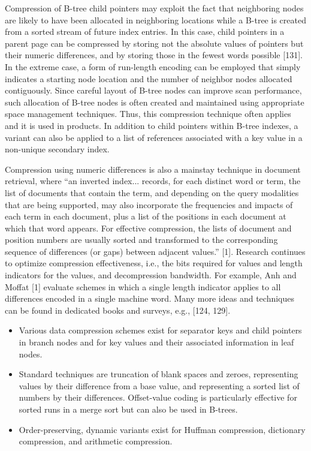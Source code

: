 Compression of B-tree child pointers may exploit the fact that
neighboring nodes are likely to have been allocated in neighboring
locations while a B-tree is created from a sorted stream of future index
entries. In this case, child pointers in a parent page can be compressed
by storing not the absolute values of pointers but their numeric
differences, and by storing those in the fewest words possible
{[}131{]}. In the extreme case, a form of run-length encoding can be
employed that simply indicates a starting node location and the number
of neighbor nodes allocated contiguously. Since careful layout of B-tree
nodes can improve scan performance, such allocation of B-tree nodes is
often created and maintained using appropriate space management
techniques. Thus, this compression technique often applies and it is
used in products. In addition to child pointers within B-tree indexes, a
variant can also be applied to a list of references associated with a
key value in a non-unique secondary index.

Compression using numeric differences is also a mainstay technique in
document retrieval, where ``an inverted index... records, for each
distinct word or term, the list of documents that contain the term, and
depending on the query modalities that are being supported, may also
incorporate the frequencies and impacts of each term in each document,
plus a list of the positions in each document at which that word
appears. For effective compression, the lists of document and position
numbers are usually sorted and transformed to the corresponding sequence
of differences (or gaps) between adjacent values.'' {[}1{]}. Research
continues to optimize compression effectiveness, i.e., the bits required
for values and length indicators for the values, and decompression
bandwidth. For example, Anh and Moffat {[}1{]} evaluate schemes in which
a single length indicator applies to all differences encoded in a single
machine word. Many more ideas and techniques can be found in dedicated
books and surveys, e.g., {[}124, 129{]}.

\begin{itemize}
\item
  Various data compression schemes exist for separator keys and child
  pointers in branch nodes and for key values and their associated
  information in leaf nodes.
\item
  Standard techniques are truncation of blank spaces and zeroes,
  representing values by their difference from a base value, and
  representing a sorted list of numbers by their differences.
  Offset-value coding is particularly effective for sorted runs in a
  merge sort but can also be used in B-trees.
\item
  Order-preserving, dynamic variants exist for Huffman compression,
  dictionary compression, and arithmetic compression.
\end{itemize}

